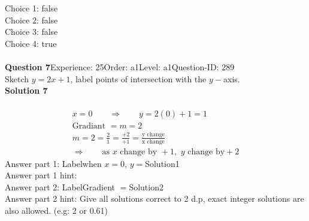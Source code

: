 \documentclass{article}
\begin{document}
Choice 1: \hspace{20pt} \hspace{20pt}false\\
Choice 2: \hspace{20pt} \hspace{20pt}false\\
Choice 3: \hspace{20pt} \hspace{20pt}false\\
Choice 4: \hspace{20pt} \hspace{20pt}true\\
\\[4pt]
\noindent\textbf{Question 7}\hspace{20pt}Experience: 25\hspace{20pt}Order: a1\hspace{20pt}Level: a1\hspace{20pt}Question-ID: 289\\[2pt]
Sketch $y=2x+1$, label points of intersection with the $y-$axis.\\[4pt]
\noindent\textbf{Solution 7}\\[2pt]
\\[-35pt]\begin{align*}
&x=0\qquad\Rightarrow\qquad y=2(0)+1=1&\\[2pt]
&\text{Gradiant}\,\,=m=2&\\[2pt]
&m=2=\displaystyle\frac{2}{1}=\displaystyle\frac{+2}{+1}=\displaystyle\frac{\text{y change}}{\text{x change}}&\\[2pt]
& \Rightarrow\qquad \text{as}\,\, x \,\,\text{change by } +1,\,\, y\,\, \text{change by} +2 &
\end{align*}
Answer part 1: \hspace{10pt}Label\hspace{10pt}when $x=0$, $y=$\hspace{10pt}Solution\hspace{10pt}1\\
Answer part 1 hint: \hspace{15pt}\\
Answer part 2: \hspace{10pt}Label\hspace{10pt}Gradient $=$\hspace{10pt}Solution\hspace{10pt}2\\
Answer part 2 hint: \hspace{15pt}Give all solutions correct to 2 d.p, exact integer solutions are also allowed. (e.g: 2 or 0.61)\\
\end{document}
